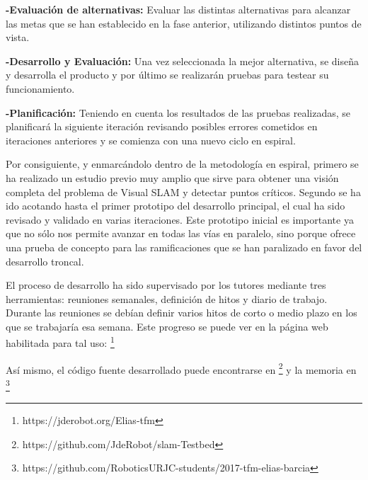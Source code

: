 \textbf{-Evaluación de alternativas:} Evaluar las distintas alternativas para alcanzar las metas que se han establecido en la fase anterior, utilizando distintos puntos de vista.

\textbf{-Desarrollo y Evaluación:} Una vez seleccionada la mejor alternativa, se diseña y desarrolla el producto y por último se realizarán pruebas para testear su funcionamiento.

\textbf{-Planificación:} Teniendo en cuenta los resultados de las pruebas realizadas, se planificará la siguiente iteración revisando posibles errores cometidos en iteraciones anteriores y se comienza con una nuevo ciclo en espiral.

Por consiguiente, y enmarcándolo dentro de la metodología en espiral, primero se ha realizado un estudio previo muy amplio que sirve para obtener una visión completa del problema de Visual SLAM y detectar puntos críticos. Segundo se ha ido acotando hasta el primer prototipo del desarrollo principal, el cual ha sido revisado y validado en varias iteraciones. Este prototipo inicial es importante ya que no sólo nos permite avanzar en todas las vías en paralelo, sino porque ofrece una prueba de concepto para las ramificaciones que se han paralizado en favor del desarrollo troncal.

El proceso de desarrollo ha sido supervisado por los tutores mediante tres herramientas: reuniones semanales, definición de hitos y diario de trabajo.
Durante las reuniones se debían definir varios hitos de corto o medio plazo en los que se trabajaría esa semana. Este progreso se puede ver en la página web habilitada para tal uso:
\footnote{https://jderobot.org/Elias-tfm}

Así mismo, el código fuente desarrollado puede encontrarse en \footnote{https://github.com/JdeRobot/slam-Testbed} y la memoria en \footnote{https://github.com/RoboticsURJC-students/2017-tfm-elias-barcia}

\clearpage
\newpage
\pagebreak


